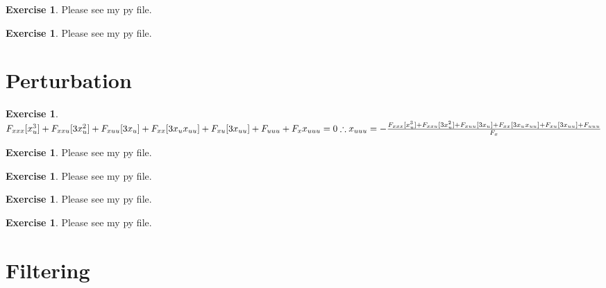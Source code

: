 \documentclass[letterpaper,12pt]{article}
\theoremstyle{definition}
\newtheorem{exercise}[theorem]{Exercise}
\begin{document}
\begin{spacing}{1.5}
	\begin{exercise} \label{Linear_HW_OLG}
Please see my py file.
	\end{exercise}

	\begin{exercise} \label{Linear_HW_OLG_Stoch}
Please see my py file.
	\end{exercise}


\section*{Perturbation}\label{Perturb_HW} 

	\begin{exercise} \label{Perturb_HW_Cubic}
$F_{xxx}[x_u^3] + F_{xxu}[3x_u^2]+F_{xuu}[3x_u] + F_{xx}[3x_ux_{uu}] + F_{xu}[3x_{uu}] + F_{uuu} + F_xx_{uuu} = 0\\
\therefore x_{uuu} = - \frac{F_{xxx}[x_u^3] + F_{xxu}[3x_u^2]+F_{xuu}[3x_u] + F_{xx}[3x_ux_{uu}] + F_{xu}[3x_{uu}] + F_{uuu}}{F_x}
$
	\end{exercise}

	\begin{exercise} \label{Perturb_HW02_GEApprox}
Please see my py file.
	\end{exercise}

	\begin{exercise} \label{Perturb_HW_Bivar_Grid}
Please see my py file.
	\end{exercise}

	\begin{exercise} \label{Perturb_HW_BM_NoStoch}
Please see my py file.
	\end{exercise}

	\begin{exercise} \label{Perturb_HW_BM}
Please see my py file.
	\end{exercise}



\section*{Filtering}\label{Filter_HW} 


\end{spacing}
\end{document}
